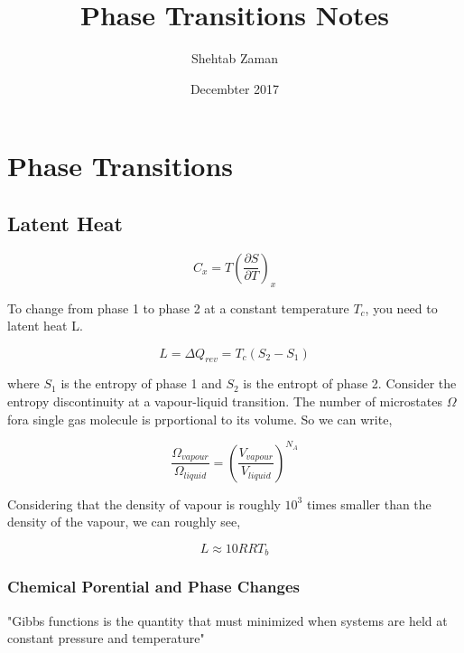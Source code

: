 \documentclass{article}
\title{Phase Transitions Notes}
\author{Shehtab Zaman}
\date{Decembter 2017}
\begin{document}
\maketitle
\section{Phase Transitions}
\subsection{Latent Heat}
$$ C_x = T \left (\frac{\partial S}{ \partial T}\right)_x $$

To change from phase 1 to phase 2 at a constant temperature $T_c$, you
need to latent heat L.

$$ L = \Delta Q_{rev} = T_c(S_2- S_1) $$

where $S_1$ is the entropy of phase 1 and $S_2$ is the entropt of phase 2.
\newline
Consider the entropy discontinuity at a vapour-liquid transition. The number
of microstates $\Omega $ fora single gas molecule is prportional to its volume.
So we can write,

$$ \frac{\Omega_{vapour}}{\Omega_{liquid}} =
\left( \frac{V_{vapour}}{V_{liquid}}\right) ^ {N_A} $$

Considering that the density of vapour is roughly $10^3$ times smaller than
the density of the vapour, we can roughly see,

$$ L \approx 10 RRT_b$$

\subsubsection{Chemical Porential and Phase Changes}

"Gibbs functions is the quantity that must minimized when systems
are held at constant pressure and temperature"
\end{document}
